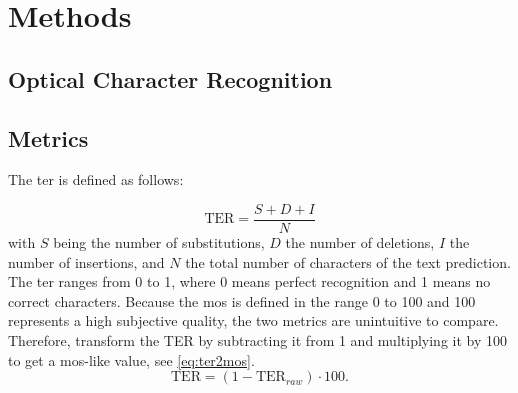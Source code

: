 \chapter{Methods}
\label{chap:methods}

\section{Optical Character Recognition}
\label{sec:ocr}

\section{Metrics}
\label{sec:metrics}

The \gls{ter} is defined as follows:

\begin{equation}
    \text{TER} = \frac{S + D + I}{N}
    \label{eq:ter}
\end{equation}
with \(S\) being the number of substitutions, \(D\) the number of deletions, \(I\) the number of insertions, and \(N\) the total number of characters of the text prediction.
The \gls{ter} ranges from 0 to 1, where 0 means perfect recognition and 1 means no correct characters.
Because the \gls{mos} is defined in the range 0 to 100 and 100 represents a high subjective quality, the two metrics are unintuitive to compare.
Therefore, transform the TER by subtracting it from 1 and multiplying it by 100 to get a \gls{mos}-like value, see \autoref{eq:ter2mos}.
\begin{equation}
    \text{TER} = (1 - \text{TER}_{raw}) \cdot 100.
    \label{eq:ter2mos}
\end{equation}
